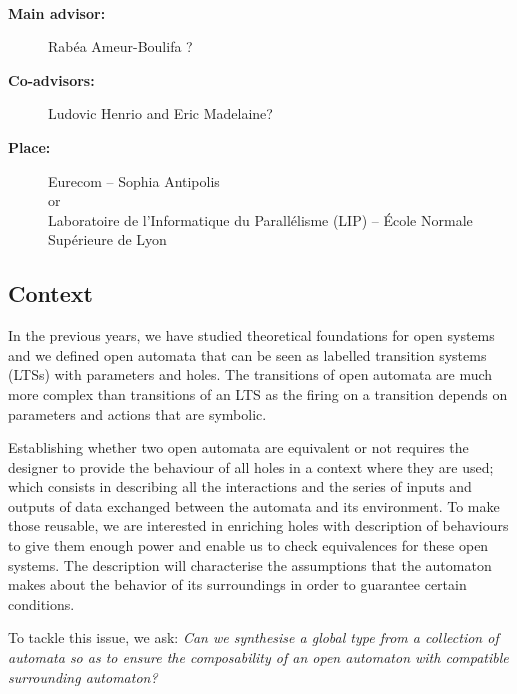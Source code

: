 \documentclass[11pt,fleqn]{article}
\begin{document}
\begin{center}
\\\bigskip
{}
\end{center}
\medskip

\begin{description}
\item[\bf Main advisor:] Rabéa Ameur-Boulifa ?
\item[\bf Co-advisors:] Ludovic Henrio and Eric Madelaine?
\item[\bf Place:] Eurecom  -- Sophia Antipolis
\\
or\\
Laboratoire de l'Informatique du Parallélisme (LIP) --
  \'Ecole Normale Supérieure de Lyon
\end{description}

\subsection*{Context}




In the previous years, we have studied theoretical foundations for open
systems and we defined  open automata \cite{arxiv-weakbisim,henrio:Forte2016,hou:hal-02406098} that can be seen as labelled transition systems (LTSs) with parameters and holes. The transitions of open
automata are much more complex than transitions of an LTS as the firing on a transition depends on parameters and actions that are symbolic.

Establishing  whether two open automata are equivalent  or not requires the designer to provide the behaviour of all holes in a context where they are used; which consists in describing all the interactions and the series of inputs and outputs of data exchanged  between the automata and its environment.  
To make those reusable, we are interested in enriching holes with description of behaviours to give them enough power and enable us to check equivalences for these open systems. The description will characterise the assumptions that the automaton makes about the behavior of its surroundings  in order to guarantee certain conditions.


To tackle this issue, we ask: { \it Can we synthesise a global type from a collection of automata so as to ensure the composability of an open automaton  with compatible  surrounding automaton? }
\end{document}
